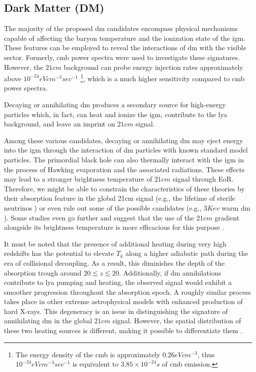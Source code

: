 \documentclass[12pt, TexShade, letterpaper]{report}
\begin{document}
\subsection{Dark Matter (DM)}
The majority of the proposed \gls{dm} candidates encompass physical mechanisms capable of affecting the baryon temperature and the ionization state of the \gls{igm}. These features can be employed to reveal the interactions of \gls{dm} with the visible sector. Formerly, \gls{cmb} power spectra were used to investigate these signatures. However, the $21cm$ background can probe energy injection rates approximately above $10^{-24}eV cm^{-3} sec^{-1}$ \footnote{The energy density of the \gls{cmb} is approximately $0.26 eV cm^{-3}$, thus $10^{-24}eV cm^{-3} sec^{-1}$ is equivalent to $3.85 \times 10^{-24} s$ of \gls{cmb} emission.}, which is a much higher sensitivity compared to \gls{cmb} power spectra.\par
Decaying or annihilating \gls{dm} produces a secondary source for high-energy particles which, in fact, can heat and ionize the \gls{igm}, contribute to the \gls{lya} background, and leave an imprint on $21cm$ signal.\par
Among these various candidates, decaying or annihilating \gls{dm} may eject energy into the \gls{igm} through the interaction of \gls{dm} particles with known standard model particles. The primordial black hole can also thermally interact with the \gls{igm} in the process of Hawking evaporation and the associated radiations. These effects may lead to a stronger brightness temperature of $21cm$ signal through EoR.  Therefore, we might be able to constrain the characteristics of these theories by their absorption feature in the global 21cm signal (e.g., the lifetime of sterile neutrinos \cite{sterile_neutrino}) \cite{primordial_bh, new_physics_thesis, primordial_bh_binary, 21limit_dm_bh, bound_dm} or even rule out some of the possible candidates (e.g., $3 Kev$ warm \gls{dm} \cite{rule_out}). Some studies even go further and suggest that the use of the $21cm$ gradient alongside its brightness temperature is more efficacious for this purpose \cite{DM_anihilation_furlantto, constrain_dm_21, DM_anihilation_1, DM_ionize, dark_cosmology_21, snowmass_dm}.\par

It must be noted that the presence of additional heating during very high redshifts has the potential to elevate $T_k$ along a higher adiabatic path during the era of collisional decoupling. As a result, this diminishes the depth of the absorption trough around $20 \lesssim z \lesssim 20$. Additionally, if \gls{dm} annihilations contribute to \gls{lya} pumping and heating, the observed signal would exhibit a smoother progression throughout the absorption epoch. A roughly similar process takes place in other extreme astrophysical models with enhanced production of hard X-rays. This degeneracy is an issue in distinguishing the signature of annihilating \gls{dm} in the global $21cm$ signal. However, the spatial distribution of these two heating sources is different, making it possible to differentiate them \cite{dark_nature_21}. \par
\end{document}
